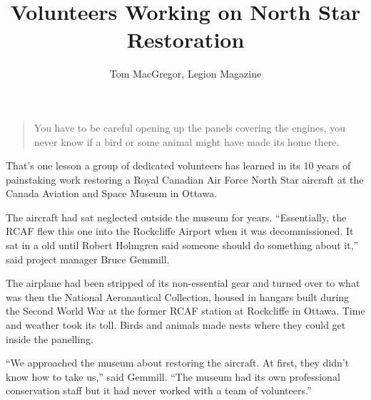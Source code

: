 %


\title{Volunteers Working on North Star Restoration}
\author{Tom MacGregor, Legion Magazine}

\maketitle


\begin{quotation}
	You have to be careful opening up the panels covering the 
	engines, you never know if a bird or some animal might have made
	its home there.
\end{quotation}

That’s one lesson a group of dedicated volunteers has learned in its
10 years of painstaking work restoring a Royal Canadian Air Force
North Star aircraft at the Canada Aviation and Space Museum in Ottawa.


The aircraft had sat neglected outside the museum for
years. “Essentially, the RCAF flew this one into the Rockcliffe Airport
when it was decommissioned. It sat in a old until Robert Holmgren said
someone should do something about it,” said project manager Bruce
Gemmill.

The airplane had been stripped of its non-essential gear and turned
over to what was then the National Aeronautical Collection, housed in
hangars built during the Second World War at the former RCAF station
at Rockcliffe in Ottawa. Time and weather took its toll. Birds and
animals made nests where they could get inside the panelling.

“We approached the museum about restoring the aircraft. At first, they
didn’t know how to take us,” said Gemmill. “The museum had its own
professional conservation staff but it had never worked with a team of
volunteers.”

